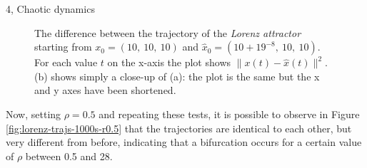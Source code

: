 \documentclass[10pt,a4paper]{article}
\begin{document}
\begin{task}{4, Chaotic dynamics}
\begin{figure}[H]
    \centering
    \hfill
    \caption{The difference between the trajectory of the \textit{Lorenz attractor} starting from $x_0=(10,\ 10,\ 10)$ and $\hat{x}_0=(10+19^{-8},\ 10,\ 10)$.
    For each value $t$ on the x-axis the plot shows $\|x(t)-\hat{x}(t)\|^2$.\\
    (b) shows simply a close-up of (a): the plot is the same but the x and y axes have been shortened.}
    \label{fig:lorenz-trajs-differences}
\end{figure}

Now, setting $\rho = 0.5$ and repeating these tests, it is possible to observe in Figure \ref{fig:lorenz-trajs-1000s-r0.5} that the trajectories are identical to each other, but very different from before, indicating that a bifurcation occurs for a certain value of $\rho$ between 0.5 and 28.


\end{task}
\end{document}
